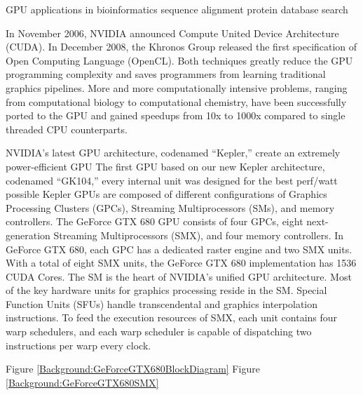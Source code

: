 GPU applications in bioinformatics
  sequence alignment \citep{123,1064}
  protein database search \citep{189}

In November 2006, NVIDIA announced Compute United Device Architecture (CUDA). In December 2008, the Khronos Group released the first specification of Open Computing Language (OpenCL). Both techniques greatly reduce the GPU programming complexity and saves programmers from learning traditional graphics pipelines. More and more computationally intensive problems, ranging from computational biology to computational chemistry, have been successfully ported to the GPU and gained speedups from 10x to 1000x compared to single threaded CPU counterparts.

NVIDIA’s latest GPU architecture, codenamed “Kepler,” create an extremely power-efficient GPU
The first GPU based on our new Kepler architecture, codenamed “GK104,” every internal unit was designed for the best perf/watt possible
Kepler GPUs are composed of different configurations of Graphics Processing Clusters (GPCs), Streaming Multiprocessors (SMs), and memory controllers. The GeForce GTX 680 GPU consists of four GPCs, eight next-generation Streaming Multiprocessors (SMX), and four memory controllers. In GeForce GTX 680, each GPC has a dedicated raster engine and two SMX units. With a total of eight SMX units, the GeForce GTX 680 implementation has 1536 CUDA Cores. The SM is the heart of NVIDIA’s unified GPU architecture. Most of the key hardware units for graphics processing reside in the SM. Special Function Units (SFUs) handle transcendental and graphics interpolation instructions. To feed the execution resources of SMX, each unit contains four warp schedulers, and each warp scheduler is capable of dispatching two instructions per warp every clock.

Figure \ref{Background:GeForceGTX680BlockDiagram}
Figure \ref{Background:GeForceGTX680SMX}


